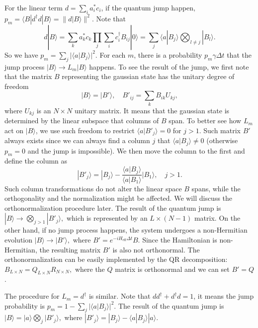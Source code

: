 \documentclass[aps,prb,superscriptaddress,nofootinbib]{revtex4}
\begin{document}
For the linear term $d = \sum_i a_i^* c_i$, if the quantum jump happen, $p_m = \langle B|d^\dagger d |B\rangle = \| d|B\rangle \|^2.$
Note that
\begin{equation}
	d|B\rangle = \sum_k a_k^* c_k \prod_{j} \sum_i c_i^\dagger B_{ij} |0\rangle
	=\sum_j \langle a|B_j\rangle \bigotimes_{l\ne j}|B_l\rangle.
\end{equation}
So we have $p_m = \sum_j |\langle a|B_j\rangle|^2$.
For each $m$, there is a probability $p_m \gamma \Delta t$ that the jump process $|B\rangle \rightarrow L_m|B\rangle$ happens.
To see the result of the jump, we first note that the matrix $B$ representing the gaussian state has the unitary degree of freedom
\begin{equation}
	|B\rangle = |B'\rangle, \quad B'_{ij} = \sum_k B_{ik}U_{kj},
\end{equation}
where $U_{kj}$ is an $N\times N$ unitary matrix.
It means that the gaussian state is determined by the linear subspace that columns of $B$ span.
To better see how $L_m$ act on $|B\rangle$, we use such freedom to restrict $\langle a| B'_{j}\rangle = 0$ for $j>1.$
Such matrix $B'$ always exists since we can always find a column $j$ that $\langle a| B_{j}\rangle \ne 0$ (otherwise $p_m=0$ and the jump is impossible).
We then move the column to the first and define the column as
\begin{equation}
	|B'_{j}\rangle = |B_{j}\rangle - \frac{\langle a|B_{j}\rangle}{\langle a|B_{1}\rangle} |B_{1}\rangle, \quad j>1.
\end{equation}
Such column transformations do not alter the linear space $B$ spans, while the orthogonality and the normalization might be affected. 
We will discuss the orthonormalization procedure later.
The result of the quantum jump is $|B\rangle \rightarrow \bigotimes_{j> 1} |B'_{j}\rangle,$
which is represented by an $L\times (N-1)$ matrix.
On the other hand, if no jump process happens, the system undergoes a non-Hermitian evolution $|B\rangle \rightarrow |B'\rangle,$ where $B' = e^{-iH_{\mathrm{eff}}\Delta t} B.$
Since the Hamiltonian is non-Hermitian, the resulting matrix $B'$ is also not orthonormal.
The orthonormalization can be easily implemented by the QR decomposition: $B_{L\times N} = Q_{L\times N} R_{N\times N},$ where the $Q$ matrix is orthonormal and we can set $B' = Q$.

The procedure for $L_m = d^\dagger$ is similar.
Note that $dd^\dagger + d^\dagger d = 1$, it means the jump probability is $p_m = 1-\sum_j |\langle a|B_j\rangle|^2.$
The result of the quantum jump is $|B\rangle = |a\rangle \bigotimes_{j}|B'_j\rangle,$ where $|B'_{j}\rangle = |B_{j}\rangle - \langle a|B_{j}\rangle |a\rangle.$
\end{document}
